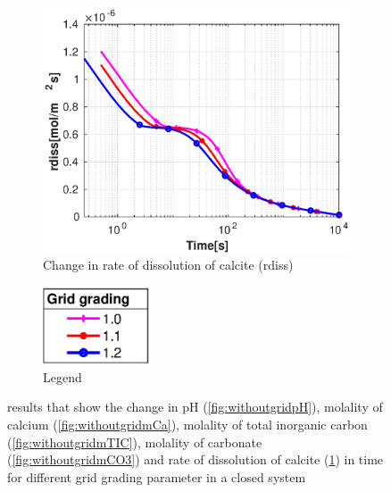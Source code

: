\begin{figure}[!h]
\begin{subfigure}{.5\linewidth}
    \end{subfigure}%
    \hfill
    \begin{subfigure}{.5\linewidth}
            \centering
        \includegraphics[width=\textwidth]{PICTURES/without_grid_rdiss.eps}
        \caption{Change in rate of dissolution of calcite (rdiss)}
        \label{fig:withoutgridrdiss}
    \end{subfigure}%
  \hfill
  \begin{subfigure}{.5\linewidth}
            \centering
        \includegraphics[width=0.35\textwidth]{PICTURES/with_grid_legend.eps}
        \caption{Legend}
        \label{fig:withoutgridlegend}
    \end{subfigure}%
    \caption{\DuMuX results that show the change in pH (\cref{fig:withoutgridpH}), molality of calcium (\cref{fig:withoutgridmCa}), molality of total inorganic carbon (\cref{fig:withoutgridmTIC}), molality of carbonate (\cref{fig:withoutgridmCO3}) and rate of dissolution of calcite (\cref{fig:withoutgridrdiss}) in time for different grid grading parameter in a closed system} 
    \label{fig:comparisionWithoutDiffgrid}
\end{figure}


